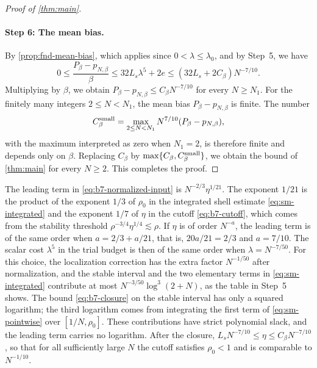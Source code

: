 \begin{proof}[Proof of \cref{thm:main}]
\paragraph{Step 6: The mean bias.} By \cref{prop:fnd-mean-bias}, which
applies since $0<\lambda\le\lambda_0$, and by Step~5, we have
\[
 0\le\frac{P_\beta-p_{N,\beta}}\beta
 \le32L_s\lambda^5+2e
 \le(32L_s+2C_\beta)N^{-7/10}.
\]
Multiplying by $\beta$, we obtain
$P_\beta-p_{N,\beta}\le C_\beta N^{-7/10}$ for every $N\ge N_1$. For the
finitely many integers $2\le N<N_1$, the mean bias $P_\beta-p_{N,\beta}$
is finite. The number
\[
 C^{\rm small}_\beta=\max_{2\le N<N_1}N^{7/10}(P_\beta-p_{N,\beta}),
\]
with the maximum interpreted as zero when $N_1=2$, is therefore finite
and depends only on $\beta$. Replacing $C_\beta$ by $\max\{C_\beta,C^{\rm small}_\beta\}$, we
obtain the bound of \cref{thm:main} for every $N\ge2$. This completes the
proof.
\end{proof}

\begin{remark}\label{rem:b7-exponents}
The leading term in \eqref{eq:b7-normalized-input} is
$N^{-2/3}\eta^{1/21}$. The exponent $1/21$ is the product of the exponent
$1/3$ of $\rho_0$ in the integrated shell estimate
\eqref{eq:sm-integrated} and the exponent $1/7$ of $\eta$ in the cutoff
\eqref{eq:b7-cutoff}, which comes from the stability threshold
$\rho^{-3/4}\eta^{1/4}\lesssim\rho$. If $\eta$ is of order $N^{-a}$,
the leading term is of the same order when $a=2/3+a/21$, that is,
$20a/21=2/3$ and $a=7/10$. The scalar cost $\lambda^5$ in the trial
budget is then of the same order when $\lambda=N^{-7/50}$. For this
choice, the localization correction has the extra factor $N^{-1/50}$
after normalization, and the stable interval and the two elementary
terms in \eqref{eq:sm-integrated} contribute at most
$N^{-3/50}\log^3(2+N)$, as the table in Step~5 shows. The bound
\eqref{eq:b7-closure} on the stable interval has only a squared
logarithm; the third logarithm comes from integrating the first term of
\eqref{eq:sm-pointwise} over $[1/N,\rho_0]$. These contributions have
strict polynomial slack, and the leading term carries no logarithm.
After the closure, $L_sN^{-7/10}\le\eta\le C_\beta N^{-7/10}$, so that
for all sufficiently large $N$ the cutoff satisfies $\rho_0<1$ and is
comparable to $N^{-1/10}$.
\end{remark}
